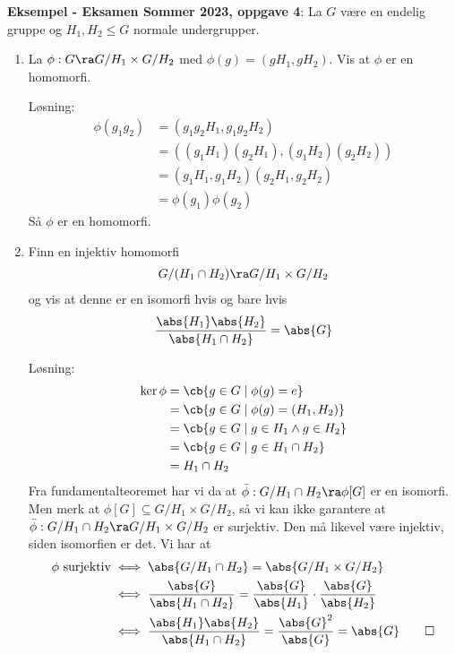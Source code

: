 \textbf{Eksempel - Eksamen Sommer 2023, oppgave 4}:
La $G$ være en endelig gruppe og $H_1, H_2\leq G$ normale undergrupper.
\begin{enumerate}[label=\alph*)]
	\item La $\phi: G\ra G/H_1\times G/H_2$ med $\phi(g)=(gH_1,gH_2)$. Vis at $\phi$ er en homomorfi.

	      Løsning:
	      \begin{align}
		      \phi(g_1g_2) & = (g_1g_2H_1, g_1g_2H_2)              \\
		                   & = ((g_1H_1)(g_2H_1),(g_1H_2)(g_2H_2)) \\
		                   & = (g_1H_1,g_1H_2)(g_2H_1,g_2H_2)      \\
		                   & = \phi(g_1)\phi(g_2)
	      \end{align}
	      Så $\phi$ er en homomorfi.
	\item Finn en injektiv homomorfi
	      \begin{align}
		      G/(H_1\cap H_2)\ra G/H_1\times G/H_2
	      \end{align}
	      og vis at denne er en isomorfi hvis og bare hvis
	      \begin{align}
		      \frac{\abs{H_1}\abs{H_2}}{\abs{H_1\cap H_2}} = \abs{G}
	      \end{align}

	      Løsning:
        \begin{align}
          \ker\phi &= \cb{g\in G\mid \phi(g) = e} \\
                   &= \cb{g\in G\mid \phi(g)=(H_1, H_2)} \\
                   &= \cb{g\in G\mid g\in H_1 \wedge g\in H_2} \\
                   &= \cb{g\in G\mid g\in H_1\cap H_2} \\
                   &= H_1\cap H_2
        \end{align}
        Fra fundamentalteoremet har vi da at $\bar\phi: G/H_1\cap H_2 \ra \phi[G]$ er en
        isomorfi. Men merk at $\phi[G]\subseteq G/H_1 \times G/H_2$, så vi kan ikke garantere
        at $\bar\phi: G/H_1\cap H_2 \ra G/H_1\times G/H_2$ er surjektiv. Den må likevel
        være injektiv, siden isomorfien er det. Vi har at
        \begin{align}
          \phi \text{ surjektiv} &\iff \abs{G/H_1\cap H_2} = \abs{G/H_1\times G/H_2} \\
                                 &\iff \frac{\abs{G}}{\abs{H_1\cap H_2}} 
                                 =\frac{\abs{G}}{\abs{H_1}}\cdot \frac{\abs{G}}{\abs{H_2}} \\
                                 &\iff \frac{\abs{H_1}\abs{H_2}}{\abs{H_1\cap H_2}}
                                 = \frac{\abs{G}^2}{\abs{G}} = \abs{G} \qed
        \end{align}
\end{enumerate}

